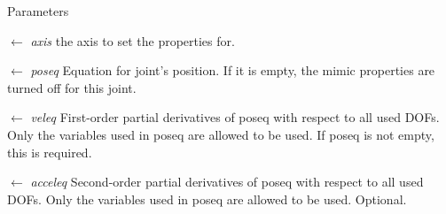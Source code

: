 \begin{DoxyParams}{Parameters}
\item[\mbox{$\leftarrow$} {\em axis}]the axis to set the properties for. \item[\mbox{$\leftarrow$} {\em poseq}]Equation for joint's position. If it is empty, the mimic properties are turned off for this joint. \item[\mbox{$\leftarrow$} {\em veleq}]First-\/order partial derivatives of poseq with respect to all used DOFs. Only the variables used in poseq are allowed to be used. If poseq is not empty, this is required. \item[\mbox{$\leftarrow$} {\em acceleq}]Second-\/order partial derivatives of poseq with respect to all used DOFs. Only the variables used in poseq are allowed to be used. Optional. \end{DoxyParams}

